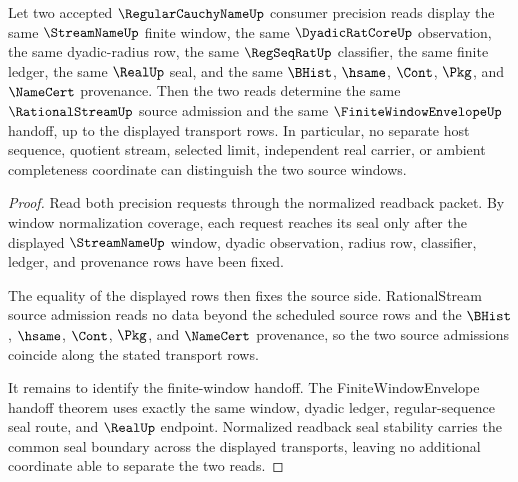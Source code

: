 \begin{theorem}
\label{thm:regularcauchyname-window-source-determinacy}
Let two accepted $\RegularCauchyNameUp$ consumer precision reads display the same $\StreamNameUp$ finite window, the same $\DyadicRatCoreUp$ observation, the same dyadic-radius row, the same $\RegSeqRatUp$ classifier, the same finite ledger, the same $\RealUp$ seal, and the same $\BHist$, $\hsame$, $\Cont$, $\Pkg$, and $\NameCert$ provenance. Then the two reads determine the same $\RationalStreamUp$ source admission and the same $\FiniteWindowEnvelopeUp$ handoff, up to the displayed transport rows. In particular, no separate host sequence, quotient stream, selected limit, independent real carrier, or ambient completeness coordinate can distinguish the two source windows.
\end{theorem}
\begin{proof}
Read both precision requests through the normalized readback packet. By window normalization coverage, each request reaches its seal only after the displayed $\StreamNameUp$ window, dyadic observation, radius row, classifier, ledger, and provenance rows have been fixed.

The equality of the displayed rows then fixes the source side. RationalStream source admission reads no data beyond the scheduled source rows and the $\BHist$, $\hsame$, $\Cont$, $\Pkg$, and $\NameCert$ provenance, so the two source admissions coincide along the stated transport rows.

It remains to identify the finite-window handoff. The FiniteWindowEnvelope handoff theorem uses exactly the same window, dyadic ledger, regular-sequence seal route, and $\RealUp$ endpoint. Normalized readback seal stability carries the common seal boundary across the displayed transports, leaving no additional coordinate able to separate the two reads.
\end{proof}

